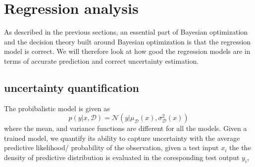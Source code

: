    
    
    



\section{Regression analysis}
As described in the previous sections, an essential part of Bayesian optimization and the decision
theory built around Bayesian optimization is that the regression model is correct. We will therefore
look at how good the regression models are in terms of accurate prediction and 
correct uncertainty estimation. 

\subsection{uncertainty quantification}
The probibalistic model is given as 
$$p(y|x,\mathcal{D}) = \mathcal{N}(y|\mu_{\mathcal{D}}(x), \sigma_{\mathcal{D}}^2(x))$$
where the mean, and variance functions are different for all the models. 
Given a trained model, we quantify its ability to capture uncertainty with the average
predictive likelihood/ probability of the observation, given a test input $x_i$ the
the density of predictive distribution is evaluated in the coresponding test output $y_i$,

